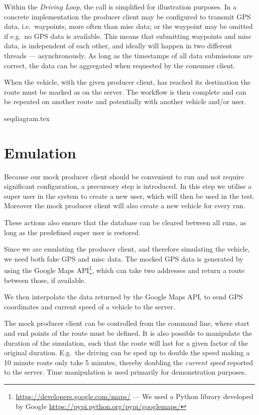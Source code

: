 Within the \textit{Driving Loop}, the  call is simplified for illustration purposes. %
In a concrete implementation the producer client may be configured to transmit GPS data, i.e.~waypoints, more often than misc data;
or the waypoint may be omitted if e.g.~no GPS data is available.
This means that submitting waypoints and misc data, is independent of each other, and ideally will happen in two different threads --- asynchronously.
As long as the timestamps of all data submissions are correct, the data can be aggregated when requested by the consumer client.

When the vehicle, with the given producer client, has reached its destination the route must be marked as  on the server.
The workflow is then complete and can be repeated on another route and potentially with another vehicle and/or user.

{seqdiagram.tex}

\section{Emulation}
Because our mock producer client should be convenient to run and not require significant configuration, a precursory step is introduced.
In this step we utilise a super user in the system to create a new user, which will then be used in the test.
Moreover the mock producer client will also create a new vehicle for every run.

These actions also ensure that the database can be cleared between all runs, as long as the predefined super user is restored.

\bigskip
Since we are emulating the producer client, and therefore simulating the vehicle, we need both fake GPS and misc data.
The mocked GPS data is generated by using the Google Maps API\footnote{\url{https://developers.google.com/maps/} --- We used a Python library developed by Google \url{https://pypi.python.org/pypi/googlemaps/}}, which can take two addresses and return a route between those, if available.

We then interpolate the data returned by the Google Maps API, to send GPS coordinates and current speed of a vehicle to the server.

The mock producer client can be controlled from the command line, where start and end points of the route must be defined.
It is also possible to manipulate the duration of the simulation, such that the route will last for a given factor of the original duration.
E.g.~the driving can be sped up to double the speed making a 10 minute route only take 5 minutes, thereby doubling the \textit{current speed} reported to the server.
Time manipulation is used primarily for demonstration purposes.


